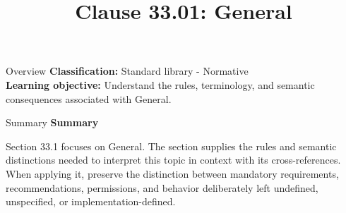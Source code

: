\documentclass[10pt,letterpaper]{article}
\title{Clause 33.01: General}
\author{}
\date{}
\begin{document}
\maketitle
\begin{CornellOverviewBox}{Overview}
\textbf{Classification:} Standard library - Normative\\[2pt]
\textbf{Learning objective:} Understand the rules, terminology, and semantic consequences associated with General.
\end{CornellOverviewBox}\begin{CornellSummaryBox}{Summary}
{\sffamily\bfseries\color{Accent} Summary}\par\vspace{3pt}Section 33.1 focuses on General. The section supplies the rules and semantic distinctions needed to interpret this topic in context with its cross-references. When applying it, preserve the distinction between mandatory requirements, recommendations, permissions, and behavior deliberately left undefined, unspecified, or implementation-defined.
\end{CornellSummaryBox}
\end{document}
